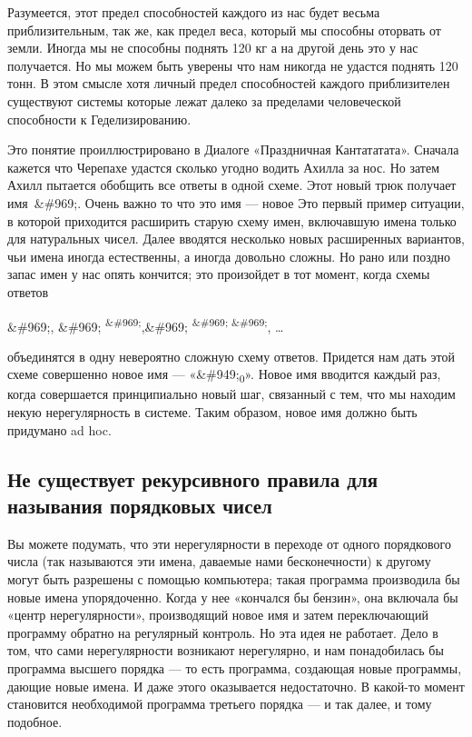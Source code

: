 \documentclass[../main.tex]{subfiles}
\begin{document}
Разумеется, этот предел способностей каждого из нас будет весьма приблизительным, так же, как предел веса, который мы способны оторвать от земли. Иногда мы не способны поднять 120 кг а на другой день это у нас получается. Но мы можем быть уверены что нам никогда не удастся поднять 120 тонн. В этом смысле хотя личный предел способностей каждого приблизителен существуют системы которые лежат далеко за пределами человеческой способности к Геделизированию.

Это понятие проиллюстрировано в Диалоге «Праздничная Кантататата». Сначала кажется что Черепахе удастся сколько угодно водить Ахилла за нос. Но затем Ахилл пытается обобщить все ответы в одной схеме. Этот новый трюк получает имя~\&\#969;. Очень важно то что это имя --- новое Это первый пример ситуации, в которой приходится расширить старую схему имен, включавшую имена только для натуральных чисел. Далее вводятся несколько новых расширенных вариантов, чьи имена иногда естественны, а иногда довольно сложны. Но рано или поздно запас имен у нас опять кончится; это произойдет в тот момент, когда схемы ответов

\&\#969;, \&\#969; \textsuperscript{\&\#969;},\&\#969; \textsuperscript{\&\#969; \&\#969;}, \ldots{}

объединятся в одну невероятно сложную схему ответов. Придется нам дать этой схеме совершенно новое имя --- «\&\#949;\textsubscript{0}». Новое имя вводится каждый раз, когда совершается принципиально новый шаг, связанный с тем, что мы находим некую нерегулярность в системе. Таким образом, новое имя должно быть придумано ad hoc.


\subsection{Не существует рекурсивного правила для называния порядковых чисел}

Вы можете подумать, что эти нерегулярности в переходе от одного порядкового числа (так называются эти имена, даваемые нами бесконечности) к другому могут быть разрешены с помощью компьютера; такая программа производила бы новые имена упорядоченно. Когда у нее «кончался бы бензин», она включала бы «центр нерегулярности», производящий новое имя и затем переключающий программу обратно на регулярный контроль. Но эта идея не работает. Дело в том, что сами нерегулярности возникают нерегулярно, и нам понадобилась бы программа высшего порядка --- то есть программа, создающая новые программы, дающие новые имена. И даже этого оказывается недостаточно. В какой-то момент становится необходимой программа третьего порядка --- и так далее, и тому подобное.
\end{document}
